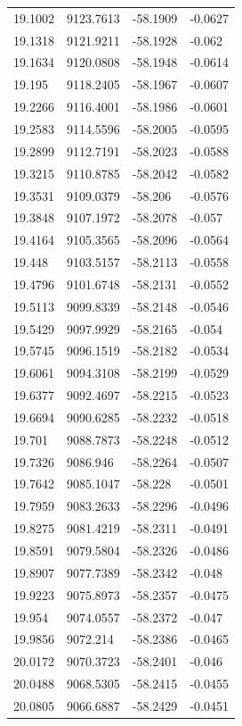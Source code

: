 \begin{table}[H]
\begin{tabular}{llll}
19.1002 & 9123.7613 & -58.1909 & -0.0627 \\
19.1318 & 9121.9211 & -58.1928 & -0.062 \\
19.1634 & 9120.0808 & -58.1948 & -0.0614 \\
19.195 & 9118.2405 & -58.1967 & -0.0607 \\
19.2266 & 9116.4001 & -58.1986 & -0.0601 \\
19.2583 & 9114.5596 & -58.2005 & -0.0595 \\
19.2899 & 9112.7191 & -58.2023 & -0.0588 \\
19.3215 & 9110.8785 & -58.2042 & -0.0582 \\
19.3531 & 9109.0379 & -58.206 & -0.0576 \\
19.3848 & 9107.1972 & -58.2078 & -0.057 \\
19.4164 & 9105.3565 & -58.2096 & -0.0564 \\
19.448 & 9103.5157 & -58.2113 & -0.0558 \\
19.4796 & 9101.6748 & -58.2131 & -0.0552 \\
19.5113 & 9099.8339 & -58.2148 & -0.0546 \\
19.5429 & 9097.9929 & -58.2165 & -0.054 \\
19.5745 & 9096.1519 & -58.2182 & -0.0534 \\
19.6061 & 9094.3108 & -58.2199 & -0.0529 \\
19.6377 & 9092.4697 & -58.2215 & -0.0523 \\
19.6694 & 9090.6285 & -58.2232 & -0.0518 \\
19.701 & 9088.7873 & -58.2248 & -0.0512 \\
19.7326 & 9086.946 & -58.2264 & -0.0507 \\
19.7642 & 9085.1047 & -58.228 & -0.0501 \\
19.7959 & 9083.2633 & -58.2296 & -0.0496 \\
19.8275 & 9081.4219 & -58.2311 & -0.0491 \\
19.8591 & 9079.5804 & -58.2326 & -0.0486 \\
19.8907 & 9077.7389 & -58.2342 & -0.048 \\
19.9223 & 9075.8973 & -58.2357 & -0.0475 \\
19.954 & 9074.0557 & -58.2372 & -0.047 \\
19.9856 & 9072.214 & -58.2386 & -0.0465 \\
20.0172 & 9070.3723 & -58.2401 & -0.046 \\
20.0488 & 9068.5305 & -58.2415 & -0.0455 \\
20.0805 & 9066.6887 & -58.2429 & -0.0451 \\

\end{tabular}
\end{table}
